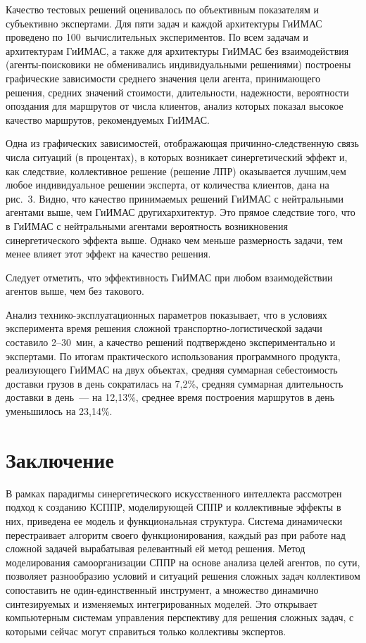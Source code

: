 \begin{multicols}{2}
  Качество тестовых решений оценивалось по объективным показателям и 
субъективно экспертами. Для пяти задач и каждой архитектуры ГиИМАС 
проведено по 100~вычислительных экспериментов. По всем задачам и 
архитектурам ГиИМАС, а также для архитектуры ГиИМАС без взаимодействия 
(аген\-ты-по\-иско\-ви\-ки не обменивались индивидуальными решениями) 
построены графические зависимости среднего значения цели агента, 
принимающего решения, средних значений стоимости, длительности, 
надежности, вероятности опоздания для маршрутов от числа клиентов, анализ 
которых показал высокое качество маршрутов, ре\-ко\-мен\-ду\-емых ГиИМАС. 

Одна из графических зависимостей, отображающая при\-чин\-но-след\-ст\-вен\-ную 
связь чис\-ла ситуаций (в процентах), в которых возникает синергетический 
эффект и, как следствие, коллективное решение (решение ЛПР) оказывается 
лучшим,\linebreak чем любое индивидуальное решении эксперта, от количества 
клиентов, дана на рис.~3. 
 Видно, что качество принимаемых решений ГиИМАС с 
нейт\-раль\-ны\-ми агентами выше, чем ГиИМАС других\linebreak архитектур. Это прямое 
следствие того, что в \mbox{ГиИМАС} с нейт\-раль\-ны\-ми агентами вероятность 
возникновения синергетического эффекта выше. Однако чем меньше 
размерность задачи, тем менее влияет этот эффект на качество решения. 

Следует отметить, что эффективность \mbox{ГиИМАС} при любом взаимодействии 
агентов выше, чем без такового.
  
  Анализ технико-эксплу\-а\-та\-ци\-он\-ных па\-ра\-мет\-ров показывает, что в 
условиях эксперимента время решения сложной 
  транс\-порт\-но-ло\-ги\-сти\-че\-ской задачи составило 2--30~мин, а качество 
решений подтверждено экспериментально и экспертами. По итогам 
практического использования программного продукта, реализующего ГиИМАС 
на двух объектах, средняя суммарная себестоимость доставки грузов в день 
сократилась на 7,2\%, средняя суммарная длительность доставки в день~--- на 
12,13\%, среднее время построения маршрутов в день уменьшилось на 23,14\%. 

\section{Заключение}

  В рамках парадигмы синергетического искусственного интеллекта 
рассмотрен подход к со\-зданию КСППР, моделирующей СППР и коллективные 
эффекты в них, приведена ее модель и функциональ\-ная структура. Система 
динамически перестраивает алгоритм своего функционирования, каждый раз 
при работе над сложной задачей вырабатывая релевантный ей метод решения. 
Метод моделирования самоорганизации СППР на основе анализа целей 
агентов, по сути, позволяет разнообразию условий и ситуаций решения 
сложных задач коллективом сопоставить не один-един\-ст\-вен\-ный 
инструмент, а множество динамично синтезируемых и изменяемых 
интегрированных моделей. Это открывает компьютерным сис\-те\-мам 
  управ\-ле\-ния перспективу для решения сложных задач, с которыми сейчас 
могут справиться только коллективы экспертов. 
  

\end{multicols}

